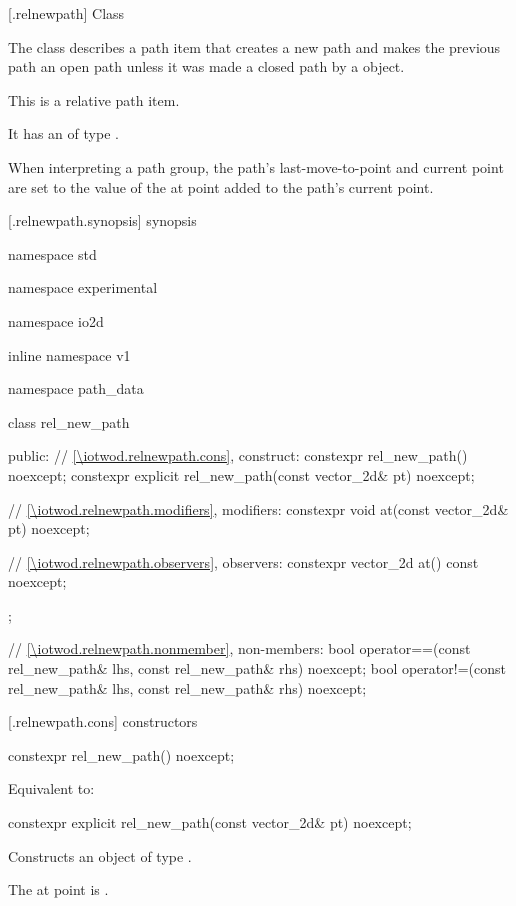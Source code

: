  [\iotwod.relnewpath] {Class }%

\pnum
{}%
The class  describes a path item that creates a new path and makes the previous path an open path unless it was made a closed path by a  object.

\pnum
This is a relative path item.

\pnum
It has an  of type .

\pnum
When interpreting a path group, the path's last-move-to-point and current point are set to the value of the at point added to the path's current point.

 [\iotwod.relnewpath.synopsis] { synopsis}%

\begin{codeblock}
namespace std { namespace experimental { namespace io2d { inline namespace v1 {
  namespace path_data {
    class rel_new_path {
    public:
      // \ref{\iotwod.relnewpath.cons}, construct:
      constexpr rel_new_path() noexcept;
      constexpr explicit rel_new_path(const vector_2d& pt) noexcept;

      // \ref{\iotwod.relnewpath.modifiers}, modifiers:
      constexpr void at(const vector_2d& pt) noexcept;

      // \ref{\iotwod.relnewpath.observers}, observers:
      constexpr vector_2d at() const noexcept;
    };
    
    // \ref{\iotwod.relnewpath.nonmember}, non-members:
    bool operator==(const rel_new_path& lhs, const rel_new_path& rhs) noexcept;
    bool operator!=(const rel_new_path& lhs, const rel_new_path& rhs) noexcept;
  }
} } } }
\end{codeblock}

 [\iotwod.relnewpath.cons] { constructors}%

%
\begin{itemdecl}
constexpr rel_new_path() noexcept;
\end{itemdecl}
\begin{itemdescr}
\pnum
\effects
Equivalent to: 
\end{itemdescr}

%
\begin{itemdecl}
constexpr explicit rel_new_path(const vector_2d& pt) noexcept;
\end{itemdecl}
\begin{itemdescr}
\pnum
\effects
Constructs an object of type .

\pnum
The at point is .
\end{itemdescr}


